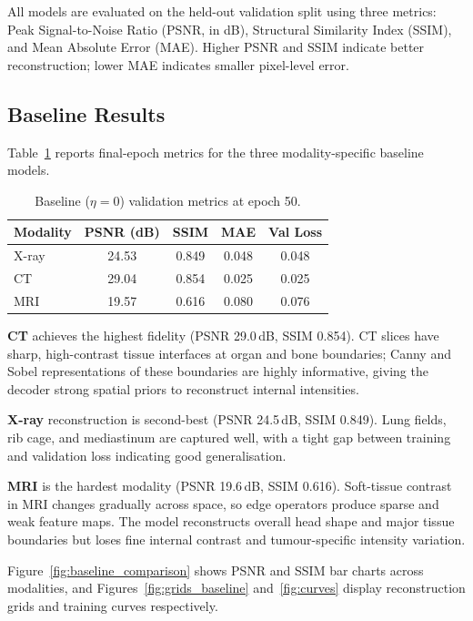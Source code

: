 \documentclass[10pt,twocolumn]{article}
\begin{document}
All models are evaluated on the held-out validation split using three metrics:
Peak Signal-to-Noise Ratio (PSNR, in dB), Structural Similarity Index (SSIM),
and Mean Absolute Error (MAE).
Higher PSNR and SSIM indicate better reconstruction; lower MAE indicates smaller
pixel-level error.

\subsection{Baseline Results}

Table~\ref{tab:baseline} reports final-epoch metrics for the three modality-specific
baseline models.

\begin{table}[h]
\centering
\caption{Baseline ($\eta=0$) validation metrics at epoch 50.}
\label{tab:baseline}
\small
\begin{tabular}{lcccc}
\toprule
Modality & PSNR (dB) & SSIM & MAE & Val Loss \\
\midrule
X-ray & 24.53 & 0.849 & 0.048 & 0.048 \\
CT    & 29.04 & 0.854 & 0.025 & 0.025 \\
MRI   & 19.57 & 0.616 & 0.080 & 0.076 \\
\bottomrule
\end{tabular}
\end{table}

\textbf{CT} achieves the highest fidelity (PSNR 29.0\,dB, SSIM 0.854).
CT slices have sharp, high-contrast tissue interfaces at organ and bone boundaries;
Canny and Sobel representations of these boundaries are highly informative,
giving the decoder strong spatial priors to reconstruct internal intensities.

\textbf{X-ray} reconstruction is second-best (PSNR 24.5\,dB, SSIM 0.849).
Lung fields, rib cage, and mediastinum are captured well, with a tight gap
between training and validation loss indicating good generalisation.

\textbf{MRI} is the hardest modality (PSNR 19.6\,dB, SSIM 0.616).
Soft-tissue contrast in MRI changes gradually across space, so edge operators
produce sparse and weak feature maps.
The model reconstructs overall head shape and major tissue boundaries but
loses fine internal contrast and tumour-specific intensity variation.

Figure~\ref{fig:baseline_comparison} shows PSNR and SSIM bar charts across
modalities, and Figures~\ref{fig:grids_baseline} and~\ref{fig:curves}
display reconstruction grids and training curves respectively.
\end{document}
